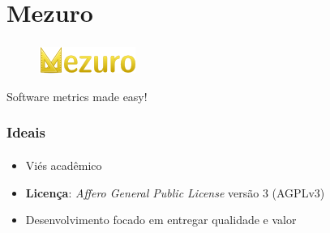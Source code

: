 \documentclass{beamer}
\begin{document}
\section{Mezuro}
\begin{frame}
  \frametitle{}
  \framesubtitle{}

  \begin{figure}[htb]
    \begin{center}
      \includegraphics[scale=1]{images/logo-mezuro.png}
    \end{center}
  \end{figure}

  Software metrics made easy!
\end{frame}

\begin{frame}
  \frametitle{Ideais}
  \framesubtitle{}

  \begin{itemize}
    \item Viés acadêmico
    \item \textbf{Licença}: \textit{Affero General Public License} versão 3 (AGPLv3)
    \item Desenvolvimento focado em entregar qualidade e valor
  \end{itemize}
\end{frame}
\end{document}
